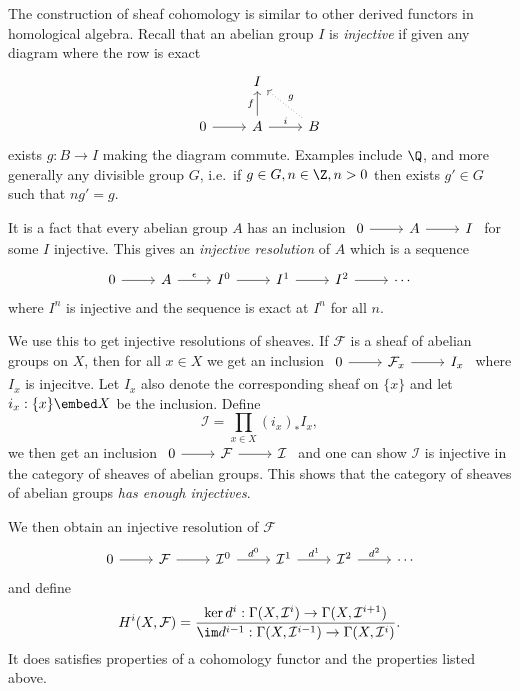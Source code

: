 \documentclass[a4paper]{article}
\newcommand{\sh}[1]{\mathcal{#1}} %
\begin{document}
The construction of sheaf cohomology is similar to other derived functors in homological algebra. Recall that an abelian group \(I\) is \emph{injective} if given any diagram where the row is exact
\[
  \begin{tikzcd}
    & I \\
    0 \ar[r] & A \ar[r, "i"] \ar[u, "f"] & B \ar[ul, dotted, "g"']
  \end{tikzcd}
\]
exists \(g: B \to I\) making the diagram commute. Examples include \(\Q\), and more generally any divisible group \(G\), i.e.\ if \(g \in G, n \in \Z, n > 0\) then exists \(g' \in G\) such that \(ng' = g\).

It is a fact that every abelian group \(A\) has an inclusion \(
\begin{tikzcd}
  0 \ar[r] & A \ar[r] & I
\end{tikzcd}
\) for some \(I\) injective. This gives an \emph{injective resolution} of \(A\) which is a sequence
\[
  \begin{tikzcd}
    0 \ar[r] & A \ar[r, "\epsilon"] & I^0 \ar[r] & I^1 \ar[r] & I^2 \ar[r] & \cdots
  \end{tikzcd}
\]
where \(I^n\) is injective and the sequence is exact at \(I^n\) for all \(n\).

We use this to get injective resolutions of sheaves. If \(\sh F\) is a sheaf of abelian groups on \(X\), then for all \(x \in X\) we get an inclusion \(
\begin{tikzcd}
  0 \ar[r] & \sh F_x \ar[r] & I_x
\end{tikzcd}
\) where \(I_x\) is injecitve. Let \(I_x\) also denote the corresponding sheaf on \(\{x\}\) and let \(i_x: \{x\} \embed X\) be the inclusion. Define
\[
  \sh I = \prod_{x \in X} (i_x)_* I_x,
\]
we then get an inclusion \(
\begin{tikzcd}
  0 \ar[r] & \sh F \ar[r] & \sh I
\end{tikzcd}
\) and one can show \(\sh I\) is injective in the category of sheaves of abelian groups. This shows that the category of sheaves of abelian groups \emph{has enough injectives}.

We then obtain an injective resolution of \(\sh F\)
\[
  \begin{tikzcd}
    0 \ar[r] & \sh F \ar[r] & \sh I^0 \ar[r, "d^0"] & \sh I^1 \ar[r, "d^1"] & \sh I^2 \ar[r, "d^2"] & \cdots
  \end{tikzcd}
\]
and define
\[
  H^i(X, \sh F) = \frac{\ker d^i: \Gamma(X, \sh I^i) \to \Gamma(X, \sh I^{i + 1})}{\im d^{i - 1}: \Gamma(X, \sh I^{i - 1}) \to \Gamma(X, \sh I^i)}.
\]
It does satisfies properties of a cohomology functor and the properties listed above.
\end{document}
